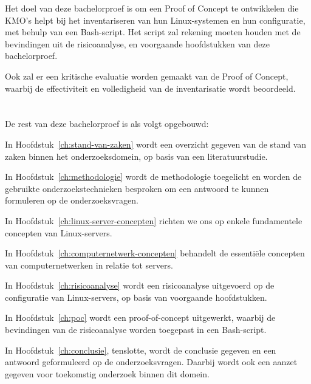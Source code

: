 Het doel van deze bachelorproef is om een Proof of Concept te ontwikkelen die KMO's helpt bij het inventariseren van hun Linux-systemen en hun configuratie, met behulp van een Bash-script.
Het script zal rekening moeten houden met de bevindingen uit de risicoanalyse, en voorgaande hoofdstukken van deze bachelorproef.

Ook zal er een kritische evaluatie worden gemaakt van de Proof of Concept, waarbij de effectiviteit en volledigheid van de inventarisatie wordt beoordeeld.

\section{}%
\label{sec:opzet-bachelorproef}


De rest van deze bachelorproef is als volgt opgebouwd:

In Hoofdstuk~\ref{ch:stand-van-zaken} wordt een overzicht gegeven van de stand van zaken binnen het onderzoeksdomein, op basis van een literatuurstudie.

In Hoofdstuk~\ref{ch:methodologie} wordt de methodologie toegelicht en worden de gebruikte onderzoekstechnieken besproken om een antwoord te kunnen formuleren op de onderzoeksvragen.


In Hoofdstuk~\ref{ch:linux-server-concepten} richten we ons op enkele fundamentele concepten van Linux-servers.

In Hoofdstuk~\ref{ch:computernetwerk-concepten} behandelt de essentiële concepten van computernetwerken in relatie tot servers.

In Hoofdstuk~\ref{ch:risicoanalyse} wordt een risicoanalyse uitgevoerd op de configuratie van Linux-servers, op basis van voorgaande hoofdstukken.

In Hoofdstuk~\ref{ch:poc} wordt een proof-of-concept uitgewerkt, waarbij de bevindingen van de risicoanalyse worden toegepast in een Bash-script.

In Hoofdstuk~\ref{ch:conclusie}, tenslotte, wordt de conclusie gegeven en een antwoord geformuleerd op de onderzoeksvragen. Daarbij wordt ook een aanzet gegeven voor toekomstig onderzoek binnen dit domein.
